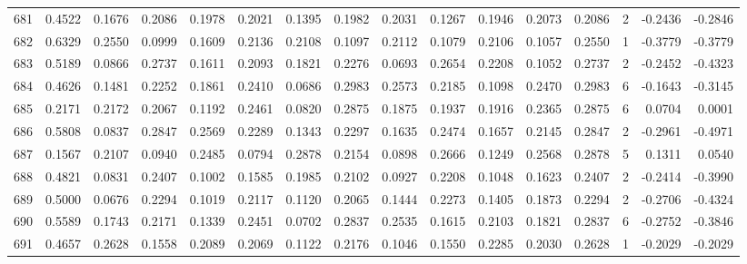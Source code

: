 \begin{tabular}{lrrrrrrrrrrrrrrr}
681 &      0.4522 &  0.1676 &  0.2086 &  0.1978 &  0.2021 &  0.1395 &  0.1982 &  0.2031 &  0.1267 &  0.1946 &   0.2073 &     0.2086 &      2 &                   -0.2436 &                    -0.2846 \\
682 &      0.6329 &  0.2550 &  0.0999 &  0.1609 &  0.2136 &  0.2108 &  0.1097 &  0.2112 &  0.1079 &  0.2106 &   0.1057 &     0.2550 &      1 &                   -0.3779 &                    -0.3779 \\
683 &      0.5189 &  0.0866 &  0.2737 &  0.1611 &  0.2093 &  0.1821 &  0.2276 &  0.0693 &  0.2654 &  0.2208 &   0.1052 &     0.2737 &      2 &                   -0.2452 &                    -0.4323 \\
684 &      0.4626 &  0.1481 &  0.2252 &  0.1861 &  0.2410 &  0.0686 &  0.2983 &  0.2573 &  0.2185 &  0.1098 &   0.2470 &     0.2983 &      6 &                   -0.1643 &                    -0.3145 \\
685 &      0.2171 &  0.2172 &  0.2067 &  0.1192 &  0.2461 &  0.0820 &  0.2875 &  0.1875 &  0.1937 &  0.1916 &   0.2365 &     0.2875 &      6 &                    0.0704 &                     0.0001 \\
686 &      0.5808 &  0.0837 &  0.2847 &  0.2569 &  0.2289 &  0.1343 &  0.2297 &  0.1635 &  0.2474 &  0.1657 &   0.2145 &     0.2847 &      2 &                   -0.2961 &                    -0.4971 \\
687 &      0.1567 &  0.2107 &  0.0940 &  0.2485 &  0.0794 &  0.2878 &  0.2154 &  0.0898 &  0.2666 &  0.1249 &   0.2568 &     0.2878 &      5 &                    0.1311 &                     0.0540 \\
688 &      0.4821 &  0.0831 &  0.2407 &  0.1002 &  0.1585 &  0.1985 &  0.2102 &  0.0927 &  0.2208 &  0.1048 &   0.1623 &     0.2407 &      2 &                   -0.2414 &                    -0.3990 \\
689 &      0.5000 &  0.0676 &  0.2294 &  0.1019 &  0.2117 &  0.1120 &  0.2065 &  0.1444 &  0.2273 &  0.1405 &   0.1873 &     0.2294 &      2 &                   -0.2706 &                    -0.4324 \\
690 &      0.5589 &  0.1743 &  0.2171 &  0.1339 &  0.2451 &  0.0702 &  0.2837 &  0.2535 &  0.1615 &  0.2103 &   0.1821 &     0.2837 &      6 &                   -0.2752 &                    -0.3846 \\
691 &      0.4657 &  0.2628 &  0.1558 &  0.2089 &  0.2069 &  0.1122 &  0.2176 &  0.1046 &  0.1550 &  0.2285 &   0.2030 &     0.2628 &      1 &                   -0.2029 &                    -0.2029 \\

\end{tabular}
